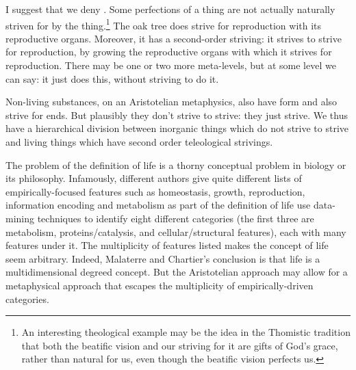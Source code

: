 I suggest that we deny . Some perfections of a thing are not actually naturally striven for by the thing.\footnote{An interesting
theological example may be the idea in the Thomistic tradition that both the beatific vision and our striving for it are gifts of God's grace, rather than
natural for us, even though the beatific vision perfects us.} The oak tree does strive for reproduction with its reproductive organs. Moreover, it has a
second-order striving: it strives to strive for reproduction, by growing the reproductive organs with which it strives for reproduction. There may be one or
two more meta-levels, but at some level we can say: it just does this, without striving to do it.

Non-living substances, on an Aristotelian metaphysics, also have form and also strive for ends. But plausibly they don't strive to strive: they just strive.
We thus have a hierarchical division between inorganic things which do not strive to strive and living things which have second order teleological strivings.

The problem of the definition of life is a thorny conceptual problem in biology or its philosophy. Infamously,
different authors give quite different lists of empirically-focused features such
as homeostasis, growth, reproduction, information encoding and metabolism as part of the definition of 
life  use data-mining techniques to identify eight different categories
(the first three are metabolism, proteins/catalysis, and cellular/structural features), each
with many features under it.
The multiplicity of features listed makes the concept of life seem arbitrary. Indeed, Malaterre and Chartier's
conclusion is that life is a multidimensional degreed concept. But the Aristotelian approach may allow for a
metaphysical approach that escapes the multiplicity of empirically-driven categories.
  
